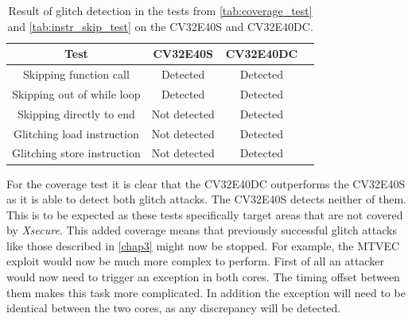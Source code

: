 \begin{table}[h]
\centering
\caption{Result of glitch detection in the tests from \autoref{tab:coverage_test} and \autoref{tab:instr_skip_test} on the CV32E40S and CV32E40DC.}
\label{tab:detection}
\setlength{\tabcolsep}{10pt} %
\renewcommand{\arraystretch}{1.5} %
\begin{tabular}{c|ccc}
\toprule 
Test                                                & CV32E40S                                      & CV32E40DC             \\     
\midrule 
\rowcolor{black!20} {Skipping function call}        & {\cellcolor[HTML]{34FF34}}{Detected} & {\cellcolor[HTML]{34FF34}}{Detected} \\ 
                    {Skipping out of while loop}    & {\cellcolor[HTML]{34FF34}}{Detected} & {\cellcolor[HTML]{34FF34}}{Detected} \\
\rowcolor{black!20} {Skipping directly to end}      & {\cellcolor[HTML]{CB0000}}{Not detected} & {\cellcolor[HTML]{34FF34}}{Detected} \\ 
                    {Glitching load instruction}    & {\cellcolor[HTML]{CB0000}}{Not detected} & {\cellcolor[HTML]{34FF34}}{Detected} \\ 
\rowcolor{black!20} {Glitching store instruction}   & {\cellcolor[HTML]{CB0000}}{Not detected} & {\cellcolor[HTML]{34FF34}}{Detected} \\
\bottomrule
\end{tabular}
\end{table}

For the coverage test it is clear that the CV32E40DC outperforms the CV32E40S as it is able to detect both glitch attacks. The CV32E40S detects neither of them. This is to be expected as these tests specifically target areas that are not covered by \textit{Xsecure}. This added coverage means that previously successful glitch attacks like those described in \autoref{chap3} might now be stopped. For example, the MTVEC exploit\cite{mtvec_corruption} would now be much more complex to perform. First of all an attacker would now need to trigger an exception in both cores. The timing offset between them makes this task more complicated. In addition the exception will need to be identical between the two cores, as any discrepancy will be detected. 